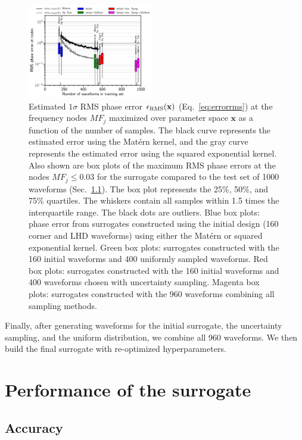 \documentclass[prd,aps,letter,twocolumn,floatfix,notitlepage,nofootinbib]{revtex4-1}
\def\bx{\mathbf{x}}
\begin{document}
\begin{figure}[htb]
\centering
\includegraphics[width=0.49\textwidth]{uncertaintysampling.pdf}
\caption{Estimated $1\sigma$ RMS phase error $\epsilon_{\rm RMS}(\bx)$ (Eq.~\eqref{eq:errorrms}) at the frequency nodes $MF_j$ maximized over parameter space $\bx$ as a function of the number of samples. The black curve represents the estimated error using the Mat\'{e}rn kernel, and the gray curve represents the estimated error using the squared exponential kernel. Also shown are box plots of the maximum RMS phase errors at the nodes $MF_j \le 0.03$ for the surrogate compared to the test set of 1000 waveforms (Sec.~\ref{sec:accuracy}). The box plot represents the 25\%, 50\%, and 75\% quartiles. The whiskers contain all samples within 1.5 times the interquartile range. The black dots are outliers. Blue box plots: phase error from surrogates constructed using the initial design (160 corner and LHD waveforms) using either the Mat\'{e}rn or squared exponential kernel. Green box plots: surrogates constructed with the 160 initial waveforms and 400 uniformly sampled waveforms. Red box plots: surrogates constructed with the 160 initial waveforms and 400 waveforms chosen with uncertainty sampling. Magenta box plots: surrogates constructed with the 960 waveforms combining all sampling methods.}
\label{fig:uncsamp}
\end{figure}

Finally, after generating waveforms for the initial surrogate, the uncertainty sampling, and the uniform distribution, we combine all 960 waveforms. We then build the final surrogate with re-optimized hyperparameters.



\section{Performance of the surrogate}

\subsection{Accuracy}
\label{sec:accuracy}
\end{document}

